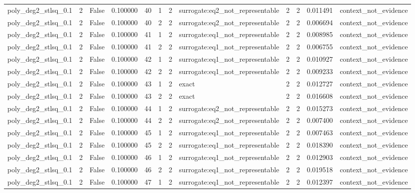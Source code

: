 \begin{tabular}{lrrrrrrlrrrl}
poly\_deg2\_stlsq\_0.1 & 2 & False & 0.100000 & 40 & 1 & 2 & surrogate:eq2\_not\_representable & 2 & 2 & 0.011491 & context\_not\_evidence \\
poly\_deg2\_stlsq\_0.1 & 2 & False & 0.100000 & 40 & 2 & 2 & surrogate:eq2\_not\_representable & 2 & 2 & 0.006694 & context\_not\_evidence \\
poly\_deg2\_stlsq\_0.1 & 2 & False & 0.100000 & 41 & 1 & 2 & surrogate:eq1\_not\_representable & 2 & 2 & 0.008985 & context\_not\_evidence \\
poly\_deg2\_stlsq\_0.1 & 2 & False & 0.100000 & 41 & 2 & 2 & surrogate:eq1\_not\_representable & 2 & 2 & 0.006755 & context\_not\_evidence \\
poly\_deg2\_stlsq\_0.1 & 2 & False & 0.100000 & 42 & 1 & 2 & surrogate:eq1\_not\_representable & 2 & 2 & 0.010927 & context\_not\_evidence \\
poly\_deg2\_stlsq\_0.1 & 2 & False & 0.100000 & 42 & 2 & 2 & surrogate:eq1\_not\_representable & 2 & 2 & 0.009233 & context\_not\_evidence \\
poly\_deg2\_stlsq\_0.1 & 2 & False & 0.100000 & 43 & 1 & 2 & exact & 2 & 2 & 0.012727 & context\_not\_evidence \\
poly\_deg2\_stlsq\_0.1 & 2 & False & 0.100000 & 43 & 2 & 2 & exact & 2 & 2 & 0.016608 & context\_not\_evidence \\
poly\_deg2\_stlsq\_0.1 & 2 & False & 0.100000 & 44 & 1 & 2 & surrogate:eq2\_not\_representable & 2 & 2 & 0.015273 & context\_not\_evidence \\
poly\_deg2\_stlsq\_0.1 & 2 & False & 0.100000 & 44 & 2 & 2 & surrogate:eq2\_not\_representable & 2 & 2 & 0.007400 & context\_not\_evidence \\
poly\_deg2\_stlsq\_0.1 & 2 & False & 0.100000 & 45 & 1 & 2 & surrogate:eq1\_not\_representable & 2 & 2 & 0.007463 & context\_not\_evidence \\
poly\_deg2\_stlsq\_0.1 & 2 & False & 0.100000 & 45 & 2 & 2 & surrogate:eq1\_not\_representable & 2 & 2 & 0.018390 & context\_not\_evidence \\
poly\_deg2\_stlsq\_0.1 & 2 & False & 0.100000 & 46 & 1 & 2 & surrogate:eq1\_not\_representable & 2 & 2 & 0.012903 & context\_not\_evidence \\
poly\_deg2\_stlsq\_0.1 & 2 & False & 0.100000 & 46 & 2 & 2 & surrogate:eq1\_not\_representable & 2 & 2 & 0.019518 & context\_not\_evidence \\
poly\_deg2\_stlsq\_0.1 & 2 & False & 0.100000 & 47 & 1 & 2 & surrogate:eq1\_not\_representable & 2 & 2 & 0.012397 & context\_not\_evidence \\

\end{tabular}
